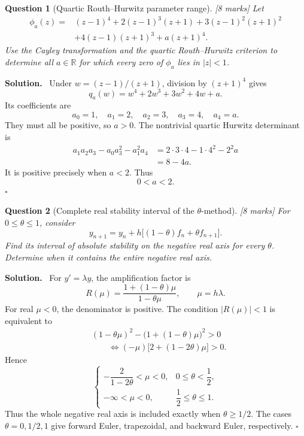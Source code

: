 \documentclass[11pt,a4paper]{article}
\theoremstyle{questionstyle}
\newtheorem{question}{Question}
\newenvironment{solution}
  {\par\noindent\textbf{\color{solutiongreen}Solution.}\ }
  {\hfill$\square$\par}
\newcommand{\pointmark}[1]{\hfill\textnormal{\textit{[#1 marks]}}}
\newcommand{\R}{\mathbb{R}}
\newcommand{\abs}[1]{\left|#1\right|}
\begin{document}
\begin{question}[Quartic Routh--Hurwitz parameter range]\pointmark{8}
Let
\[
\begin{split}
  \phi_a(z)={}&(z-1)^4+2(z-1)^3(z+1)
  +3(z-1)^2(z+1)^2\\
  &+4(z-1)(z+1)^3+a(z+1)^4.
\end{split}
\]
Use the Cayley transformation and the quartic Routh--Hurwitz
criterion to determine all \(a\in\R\) for which every zero of
\(\phi_a\) lies in \(\abs z<1\).
\end{question}

\begin{solution}
Under \(w=(z-1)/(z+1)\), division by \((z+1)^4\) gives
\[
  q_a(w)=w^4+2w^3+3w^2+4w+a.
\]
Its coefficients are
\[
  a_0=1,\quad a_1=2,\quad a_2=3,\quad a_3=4,\quad a_4=a.
\]
They must all be positive, so \(a>0\).  The nontrivial quartic
Hurwitz determinant is
\[
\begin{split}
  a_1a_2a_3-a_0a_3^2-a_1^2a_4
  &=2\cdot3\cdot4-1\cdot4^2-2^2a\\
  &=8-4a.
\end{split}
\]
It is positive precisely when \(a<2\).  Thus
\[
  \boxed{0<a<2}.
\]
\end{solution}

\begin{question}[Complete real stability interval of the
\(\theta\)-method]\pointmark{8}
For \(0\leq\theta\leq1\), consider
\[
  y_{n+1}=y_n+h\bigl[(1-\theta)f_n+\theta f_{n+1}\bigr].
\]
Find its interval of absolute stability on the negative real axis for
every \(\theta\).  Determine when it contains the entire negative real
axis.
\end{question}

\begin{solution}
For \(y'=\lambda y\), the amplification factor is
\[
  R(\mu)=\frac{1+(1-\theta)\mu}{1-\theta\mu},
  \qquad \mu=h\lambda.
\]
For real \(\mu<0\), the denominator is positive.  The condition
\(\abs{R(\mu)}<1\) is equivalent to
\[
\begin{split}
  &(1-\theta\mu)^2-
  \bigl(1+(1-\theta)\mu\bigr)^2>0\\
  &\qquad\Longleftrightarrow
  (-\mu)\bigl[2+(1-2\theta)\mu\bigr]>0.
\end{split}
\]
Hence
\[
  \boxed{
  \begin{cases}
  -\dfrac{2}{1-2\theta}<\mu<0,
       &0\leq\theta<\dfrac12,\\[6pt]
  -\infty<\mu<0,
       &\dfrac12\leq\theta\leq1.
  \end{cases}}
\]
Thus the whole negative real axis is included exactly when
\(\theta\geq1/2\).  The cases \(\theta=0,1/2,1\) give forward Euler,
trapezoidal, and backward Euler, respectively.
\end{solution}
\end{document}
